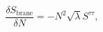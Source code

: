 \begin{equation}
\frac{\delta S_\textrm{brane}}{\delta N}=-N^2\sqrt{\lambda}S^{\tau\tau},
\end{equation}

